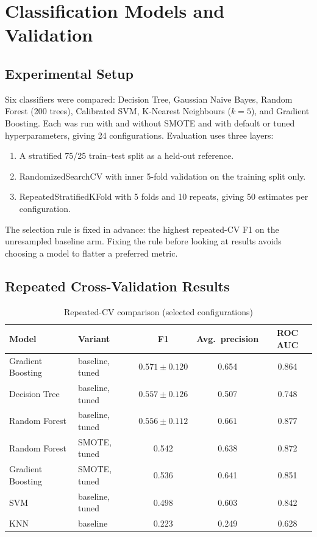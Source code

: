 \chapter{Classification Models and Validation}
\section{Experimental Setup}
Six classifiers were compared: Decision Tree, Gaussian Naive Bayes, Random Forest (200 trees), Calibrated SVM, K-Nearest Neighbours ($k=5$), and Gradient Boosting. Each was run with and without SMOTE and with default or tuned hyperparameters, giving 24 configurations. Evaluation uses three layers:

\begin{enumerate}
    \item A stratified 75/25 train--test split as a held-out reference.
    \item RandomizedSearchCV with inner 5-fold validation on the training split only.
    \item RepeatedStratifiedKFold with 5 folds and 10 repeats, giving 50 estimates per configuration.
\end{enumerate}

The selection rule is fixed in advance: the highest repeated-CV F1 on the unresampled baseline arm. Fixing the rule before looking at results avoids choosing a model to flatter a preferred metric.

\section{Repeated Cross-Validation Results}
\begin{table}[H]
    \centering
    \small
    \renewcommand{\arraystretch}{1.25}
    \begin{tabular}{|l|l|c|c|c|}
        \hline
        \textbf{Model} & \textbf{Variant} & \textbf{F1} & \textbf{Avg.\ precision} & \textbf{ROC AUC} \\
        \hline
        Gradient Boosting & baseline, tuned & $\mathbf{0.571 \pm 0.120}$ & 0.654 & 0.864 \\
        Decision Tree & baseline, tuned & $0.557 \pm 0.126$ & 0.507 & 0.748 \\
        Random Forest & baseline, tuned & $0.556 \pm 0.112$ & $\mathbf{0.661}$ & $\mathbf{0.877}$ \\
        Random Forest & SMOTE, tuned & 0.542 & 0.638 & 0.872 \\
        Gradient Boosting & SMOTE, tuned & 0.536 & 0.641 & 0.851 \\
        SVM & baseline, tuned & 0.498 & 0.603 & 0.842 \\
        KNN & baseline & 0.223 & 0.249 & 0.628 \\
        \hline
    \end{tabular}
    \caption{Repeated-CV comparison (selected configurations)}
    \label{tab:cv_results}
\end{table}


